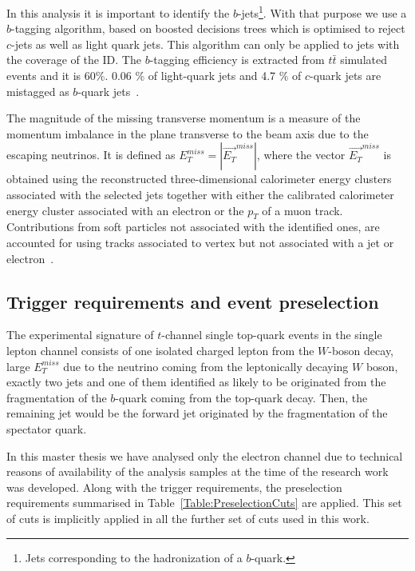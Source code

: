 In this analysis it is important to identify the $b$-jets\footnote{Jets corresponding to the hadronization of a $b$-quark.}. With that purpose we use a $b$-tagging algorithm, based on boosted decisions trees which is optimised to reject $c$-jets as well as light quark jets. This algorithm can only be applied to jets with the coverage of the ID. The $b$-tagging efficiency is extracted from $t\bar{t}$ simulated events and it is 60\%. 0.06 \% of light-quark jets and 4.7 \% of $c$-quark jets are mistagged as $b$-quark jets~\cite{Aaboud:2016ymp}.

The magnitude of the missing transverse momentum is a measure of the momentum imbalance in the plane transverse to the beam axis due to the escaping neutrinos. It is defined as $E_T^{miss}= |\overrightarrow{E_T}^{miss}|$, where the vector $\overrightarrow{E_T}^{miss}$ is obtained using the reconstructed three-dimensional calorimeter energy clusters associated with the selected jets together with either the calibrated calorimeter energy cluster associated with an electron or the $p_T$ of a muon track. Contributions from soft particles not associated with the identified ones, are accounted for using tracks associated to vertex but not associated with a jet or electron~\cite{Aaboud:2016ymp}.


\subsection{Trigger requirements and event preselection}

The experimental signature of $t$-channel single top-quark events in the single lepton channel consists of one isolated charged lepton from the $W$-boson decay, large $E_T^{miss}$ due to the neutrino coming from the leptonically decaying $W$ boson, exactly two jets and one of them identified as likely to be originated from the fragmentation
of the $b$-quark coming from the top-quark decay. Then, the remaining jet would be the forward jet originated by the fragmentation of the spectator quark.

In this master thesis we have analysed only the electron channel due to technical reasons of availability of the analysis samples at the time of the research work was developed. Along with the trigger requirements, the preselection requirements summarised in Table~\ref{Table:PreselectionCuts} are applied. This set of cuts is implicitly applied in all the further set of cuts used in this work.

